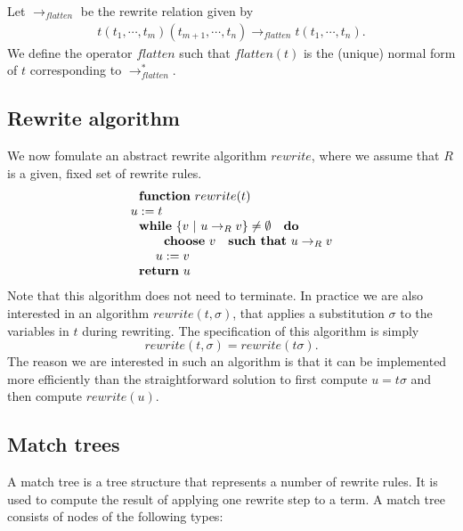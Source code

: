 \documentclass{article}
\begin{document}
Let $\rightarrow _{flatten}$ be the rewrite relation given by%
\begin{equation*}
\begin{array}{c}
t(t_{1},\cdots ,t_{m})(t_{m+1},\cdots ,t_{n})\rightarrow
_{flatten}t(t_{1},\cdots ,t_{n}).%
\end{array}%
\end{equation*}%
We define the operator $flatten$ such that $flatten(t)$ is the (unique)
normal form of $t$ corresponding to $\rightarrow _{flatten}^{\ast }$.

\subsection{Rewrite algorithm}

We now fomulate an abstract rewrite algorithm $rewrite$, where we assume
that $R$ is a given, fixed set of rewrite rules.%
\begin{equation*}
\begin{array}{l}
\text{\textbf{function} }rewrite(t) \\ 
u:=t \\ 
\text{\textbf{while} }\{v\ |\ u\rightarrow _{R}v\}\neq \emptyset \text{ 
\textbf{do}} \\ 
\qquad \text{\textbf{choose} }v\text{ \textbf{such that} }u\rightarrow _{R}v
\\ 
\qquad u:=v \\ 
\text{\textbf{return} }u%
\end{array}%
\end{equation*}%
Note that this algorithm does not need to terminate. In practice we are also
interested in an algorithm $rewrite(t,\sigma )$, that applies a substitution 
$\sigma $ to the variables in $t$ during rewriting. The specification of
this algorithm is simply%
\begin{equation*}
rewrite(t,\sigma )=rewrite(t\sigma ).
\end{equation*}%
The reason we are interested in such an algorithm is that it can be
implemented more efficiently than the straightforward solution to first
compute $u=t\sigma $ and then compute $rewrite(u)$.

\subsection{Match trees}

A match tree is a tree structure that represents a number of rewrite rules.
It is used to compute the result of applying one rewrite step to a term. A
match tree consists of nodes of the following types:
\end{document}
